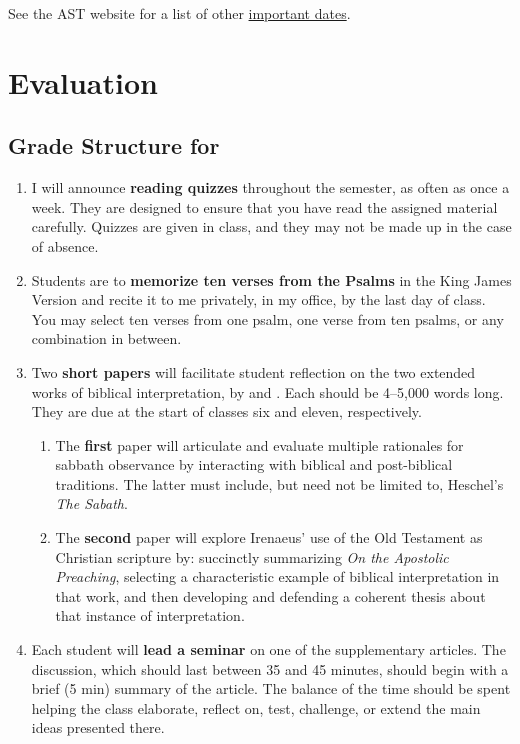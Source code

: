 \documentclass[titlepage]{article}
\begin{document}
See the AST website for a list of other \href{http://www.astheology.ns.ca/students/academic-dates.html}{important dates}.

\section{Evaluation}
\label{evaluation}

\subsection{Grade Structure for \ccode}
\label{structure}

\begin{enumerate}

	\item I will announce \textbf{reading quizzes} throughout the
	semester, as often as once a week. They are designed to ensure that
	you have read the assigned material carefully. Quizzes are given in
	class, and they may not be made up in the case of absence.

	\item Students are to \textbf{memorize ten verses from the Psalms}
	in the King James Version and recite it to me privately, in my
	office, by the last day of class. You may select ten verses from one
	psalm, one verse from ten psalms, or any combination in between.

	\item Two \textbf{short papers} will facilitate student reflection
	on the two extended works of biblical interpretation, by
	\cite{heschel} and \cite{irenaeus}. Each should be 4--5,000 words
	long. They are due at the start of classes six and eleven,
	respectively.

	\begin{enumerate}

		\item The \textbf{first} paper will articulate and evaluate
		multiple rationales for sabbath observance by interacting with
		biblical and post-biblical traditions. The latter must include,
		but need not be limited to, Heschel's \emph{The Sabath}.

		\item The \textbf{second} paper will explore Irenaeus' use of
		the Old Testament as Christian scripture by: succinctly
		summarizing \emph{On the Apostolic Preaching}, selecting a
		characteristic example of biblical interpretation in that work,
		and then developing and defending a coherent thesis about that
		instance of interpretation.

	\end{enumerate}

	\item Each student will \textbf{lead a seminar} on one of the
	supplementary articles. The discussion, which should last between 35
	and 45 minutes, should begin with a brief (5 min) summary of the
	article. The balance of the time should be spent helping the class
	elaborate, reflect on, test, challenge, or extend the main ideas
	presented there.

\end{enumerate}
\end{document}
